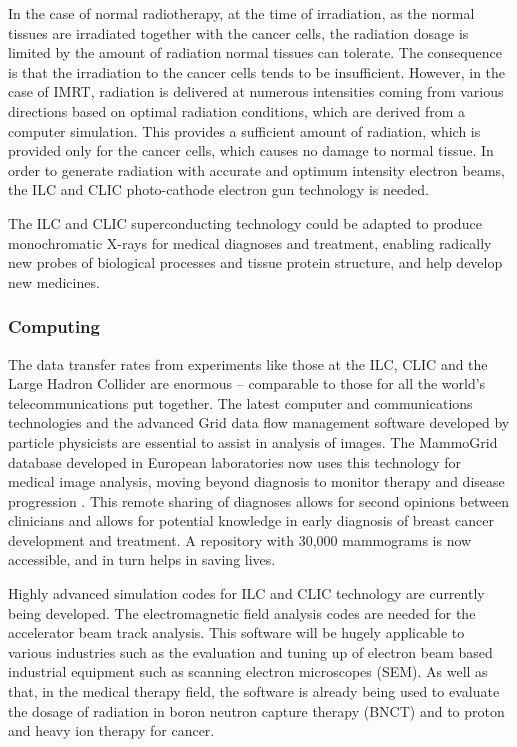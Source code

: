 In the case of normal radiotherapy, at the time of irradiation, as the normal tissues are irradiated together with the cancer cells, the radiation dosage is limited by the amount of radiation normal tissues can tolerate. The consequence is that the irradiation to the cancer cells tends to be insufficient. However, in the case of IMRT, radiation is delivered at numerous intensities coming from various directions based on optimal radiation conditions, which are derived from a computer simulation. This provides a sufficient amount of radiation, which is provided only for the cancer cells, which causes no damage to normal tissue. In order to generate radiation with accurate and optimum intensity electron beams, the ILC and CLIC photo-cathode electron gun technology is needed.
 
The ILC and CLIC superconducting technology could be adapted to produce monochromatic X-rays for medical diagnoses and treatment, enabling radically new probes of biological processes and tissue protein structure, and help develop new medicines.
 
\subsubsection{Computing}

The data transfer rates from experiments like those at the ILC, CLIC and the Large Hadron Collider are enormous – comparable to those for all the world's telecommunications put together. The latest computer and communications technologies and the advanced Grid data flow management software developed by particle physicists are essential to assist in analysis of images. The MammoGrid database developed in European laboratories now uses this technology for medical image analysis, moving beyond diagnosis to monitor therapy and disease progression \cite{CERN:MammoGrid}. This remote sharing of diagnoses allows for second opinions between clinicians and allows for potential knowledge in early diagnosis of breast cancer development and treatment. A repository with 30,000 mammograms is now accessible, and in turn helps in saving lives. \cite{ILC:WhyNeed}
 
Highly advanced simulation codes for ILC and CLIC technology are currently being developed. The electromagnetic field analysis codes are needed for the accelerator beam track analysis. This software will be hugely applicable to various industries such as the evaluation and tuning up of electron beam based industrial equipment such as scanning electron microscopes (SEM). As well as that, in the medical therapy field, the software is already being used to evaluate the dosage of radiation in boron neutron capture therapy (BNCT) and to proton and heavy ion therapy for cancer.

